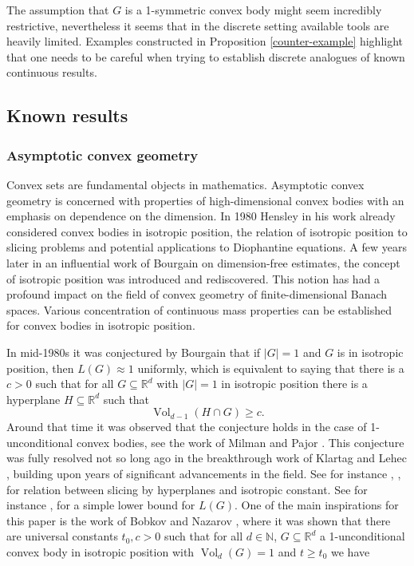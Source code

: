 \documentclass[a4paper,oneside, reqno]{amsart}
\numberwithin{equation}{section}
\theoremstyle{definition}%
\theoremstyle{definition}
\theoremstyle{definition}%
\theoremstyle{definition}
\newcommand{\R}{\mathbb{R}}
\newcommand{\N}{\mathbb{N}}
\DeclareMathOperator{\Vol}{Vol}
\begin{document}
\par The assumption that $G$ is a 1-symmetric convex body might seem incredibly restrictive, nevertheless it seems that in the discrete setting available tools are heavily limited. Examples constructed in Proposition \ref{counter-example} highlight that one needs to be careful when trying to establish discrete analogues of known continuous results.

\subsection{Known results}
\subsubsection{Asymptotic convex geometry}
Convex sets are fundamental objects in mathematics. Asymptotic convex geometry is concerned with properties of high-dimensional convex bodies with an emphasis on dependence on the dimension. In 1980 Hensley in his work \cite{He} already considered convex bodies in isotropic position, the relation of isotropic position to slicing problems and potential applications to Diophantine equations. A few years later in an influential work \cite{B1} of Bourgain on dimension-free estimates, the concept of isotropic position was introduced and rediscovered.
This notion has had a profound impact on the field of convex geometry of finite-dimensional Banach spaces. Various concentration of continuous mass properties can be established for convex bodies in isotropic position. 
\par In mid-1980s it was conjectured by Bourgain that if $|G|=1$ and $G$ is in isotropic position, then $L(G) \approx 1$ uniformly, which is equivalent to saying that there is a $c>0$ such that for all $G \subseteq \R^d$ with $|G|=1$ in isotropic position there is a hyperplane $H \subseteq \R^d$ such that 
\[
\Vol_{d-1}(H \cap G) \ge c.
\]
Around that time it was observed that the conjecture holds in the case of 1-unconditional convex bodies, see the work of Milman and Pajor \cite[b. Proposition, p. 85]{MP}.
This conjecture was fully resolved not so long ago in the breakthrough work of Klartag and Lehec \cite{iso conj}, building upon years of significant advancements in the field. See for instance \cite{He}, \cite[Section 3]{MP}, \cite[Theorem 3.1.2]{conv book} for relation between slicing by hyperplanes and isotropic constant. See for instance \cite[Lemma 4.1]{MP}, \cite[Proposition 3.3.1]{conv book} for a simple lower bound for $L(G)$.  
One of the main inspirations for this paper is the work of Bobkov and Nazarov \cite{bob-naz}, where it was shown that there are universal constants $t_0,c>0$ such that for all $d \in \N$, $G \subseteq\R^d$ a 1-unconditional convex body in isotropic position with $\Vol_d(G)=1$ and $t \ge t_0$ we have
\end{document}
